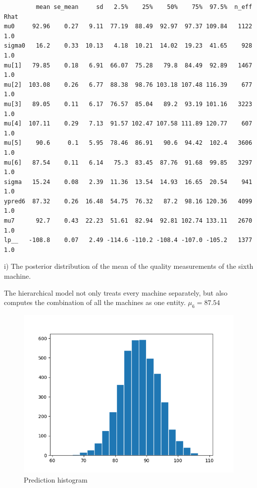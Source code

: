 \documentclass{article}
\begin{document}
\begin{verbatim}  
         mean se_mean     sd   2.5%    25%    50%    75%  97.5%  n_eff   Rhat
mu0     92.96    0.27   9.11  77.19  88.49  92.97  97.37 109.84   1122    1.0
sigma0   16.2    0.33  10.13   4.18  10.21  14.02  19.23  41.65    928    1.0
mu[1]   79.85    0.18   6.91  66.07  75.28   79.8  84.49  92.89   1467    1.0
mu[2]  103.08    0.26   6.77  88.38  98.76 103.18 107.48 116.39    677    1.0
mu[3]   89.05    0.11   6.17  76.57  85.04   89.2  93.19 101.16   3223    1.0
mu[4]  107.11    0.29   7.13  91.57 102.47 107.58 111.89 120.77    607    1.0
mu[5]    90.6     0.1   5.95  78.46  86.91   90.6  94.42  102.4   3606    1.0
mu[6]   87.54    0.11   6.14   75.3  83.45  87.76  91.68  99.85   3297    1.0
sigma   15.24    0.08   2.39  11.36  13.54  14.93  16.65  20.54    941    1.0
ypred6  87.32    0.26  16.48  54.75  76.32   87.2  98.16 120.36   4099    1.0
mu7      92.7    0.43  22.23  51.61  82.94  92.81 102.74 133.11   2670    1.0
lp__   -108.8    0.07   2.49 -114.6 -110.2 -108.4 -107.0 -105.2   1377    1.0
\end{verbatim}


i) The posterior distribution of the mean of the quality measurements of the sixth machine.

The hierarchical model not only treats every machine separately, but also computes the combination of all the machines as one entity. $\mu_6=87.54$

\begin{figure}[H]
\centering  
\includegraphics[scale=0.5]{hierarchical_hist_mu_six.png}
\caption{Prediction histogram}
\label{fig: label}
\end{figure}
\end{document}
